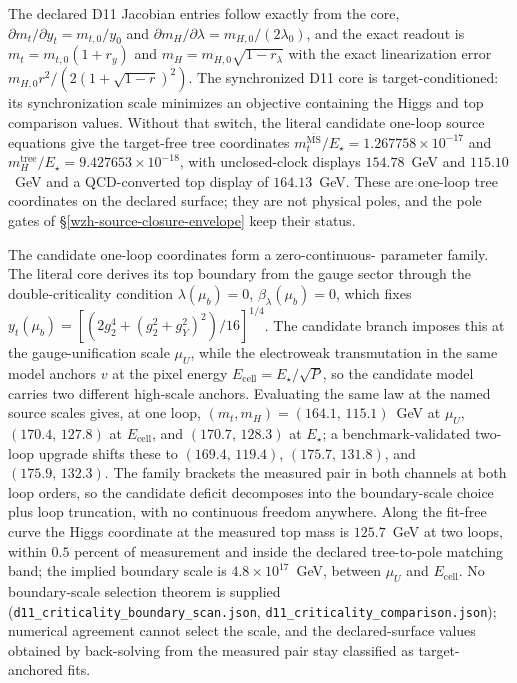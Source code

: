 \documentclass[11pt]{article}
\begin{document}
The declared D11 Jacobian entries follow exactly from the core,
\(\partial m_t/\partial y_t=m_{t,0}/y_0\) and
\(\partial m_H/\partial\lambda=m_{H,0}/(2\lambda_0)\), and the exact readout
is \(m_t=m_{t,0}(1+r_y)\) and \(m_H=m_{H,0}\sqrt{1-r_\lambda}\) with the
exact linearization error \(m_{H,0}r^2/(2(1+\sqrt{1-r})^2)\).  The
synchronized D11 core is target-conditioned: its synchronization scale
minimizes an objective containing the Higgs and top comparison values.
Without that switch, the literal candidate one-loop source equations give the target-free tree coordinates
\(m_t^{\overline{\mathrm{MS}}}/E_\star=1.267758\times10^{-17}\) and
\(m_H^{\mathrm{tree}}/E_\star=9.427653\times10^{-18}\), with unclosed-clock
displays \(154.78\)~GeV and \(115.10\)~GeV and a QCD-converted top display of
\(164.13\)~GeV.  These are one-loop tree coordinates on the declared surface;
they are not physical poles, and the pole gates of
\S\ref{wzh-source-closure-envelope} keep their status.

The candidate one-loop coordinates form a zero-continuous-%
parameter family.  The literal core derives its top boundary from the gauge
sector through the double-criticality condition
\(\lambda(\mu_b)=0\), \(\beta_\lambda(\mu_b)=0\), which fixes
\(y_t(\mu_b)=[(2g_2^4+(g_2^2+g_Y^2)^2)/16]^{1/4}\). The candidate branch
imposes this at the gauge-unification scale \(\mu_U\), while the electroweak
transmutation in the same model anchors \(v\) at the pixel energy
\(E_{\mathrm{cell}}=E_\star/\sqrt P\), so the candidate model carries two
different high-scale anchors.  Evaluating the same law at the named source
scales gives, at one loop, \((m_t,m_H)=(164.1,\,115.1)\)~GeV at \(\mu_U\),
\((170.4,\,127.8)\) at \(E_{\mathrm{cell}}\), and \((170.7,\,128.3)\) at
\(E_\star\); a benchmark-validated two-loop upgrade shifts these to
\((169.4,\,119.4)\), \((175.7,\,131.8)\), and \((175.9,\,132.3)\).  The
family brackets the measured pair in both channels at both loop orders, so
the candidate deficit decomposes into the boundary-scale choice plus loop
truncation, with no continuous freedom anywhere.  Along the fit-free curve
the Higgs coordinate at the measured top mass is \(125.7\)~GeV at two loops,
within \(0.5\) percent of measurement and inside the declared tree-to-pole
matching band; the implied boundary scale is \(4.8\times10^{17}\)~GeV,
between \(\mu_U\) and \(E_{\mathrm{cell}}\). No boundary-scale selection theorem is supplied
(\texttt{d11\_criticality\_boundary\_scan.json},
\texttt{d11\_criticality\_comparison.json}); numerical agreement cannot
select the scale, and the declared-surface values obtained by back-solving
from the measured pair stay classified as target-anchored fits.
\end{document}
